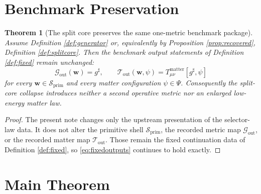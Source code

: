 \documentclass[11pt]{article}
\newcommand{\CompletedMetric}{g^{\sharp}}
\newcommand{\PrimShell}{\mathcal S_{\mathrm{prim}}}
\newcommand{\MetricOut}{\mathscr G_{\mathrm{out}}}
\newcommand{\MatterOut}{\mathscr T_{\mathrm{out}}}
\newtheorem{theorem}{Theorem}
\begin{document}
\section{Benchmark Preservation}

\begin{theorem}[The split core preserves the same one-metric benchmark package]
\label{thm:outputs}
Assume Definition \ref{def:generator} or, equivalently by Proposition \ref{prop:recovered}, Definition \ref{def:splitcore}. Then the benchmark output statements of Definition \ref{def:fixed} remain unchanged:
\[
\MetricOut(\mathbf w)=\CompletedMetric,
\qquad
\MatterOut(\mathbf w,\psi)
=
T_{\mu\nu}^{\mathrm{matter}}[\CompletedMetric,\psi]
\]
for every \(\mathbf w\in\PrimShell\) and every matter configuration \(\psi\in\Psi\). Consequently the split-core collapse introduces neither a second operative metric nor an enlarged low-energy matter law.
\end{theorem}

\begin{proof}
The present note changes only the upstream presentation of the selector-law data. It does not alter the primitive shell \(\PrimShell\), the recorded metric map \(\MetricOut\), or the recorded matter map \(\MatterOut\). Those remain the fixed continuation data of Definition \ref{def:fixed}, so \eqref{eq:fixedoutputs} continues to hold exactly.
\end{proof}

\section{Main Theorem}
\end{document}
